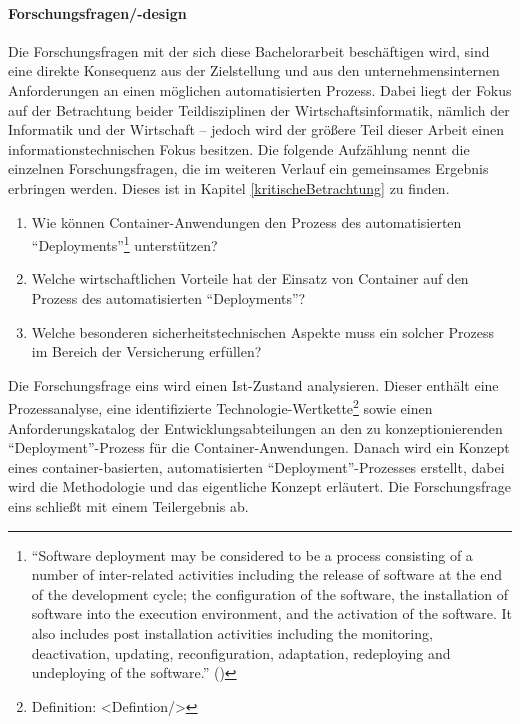 \paragraph{Forschungsfragen/-design}
Die Forschungsfragen mit der sich diese Bachelorarbeit beschäftigen wird, sind eine direkte Konsequenz aus der Zielstellung und aus den unternehmensinternen Anforderungen an einen möglichen automatisierten Prozess. Dabei liegt der Fokus auf der Betrachtung beider Teildisziplinen der Wirtschaftsinformatik, nämlich der Informatik und der Wirtschaft -- jedoch wird der größere Teil dieser Arbeit einen informationstechnischen Fokus besitzen. Die folgende Aufzählung nennt die einzelnen Forschungsfragen, die im weiteren Verlauf ein gemeinsames Ergebnis erbringen werden. Dieses ist in Kapitel \vref{kritischeBetrachtung} zu finden.
\begin{enumerate}
	\item Wie können Container-Anwendungen den Prozess des automatisierten \enquote{Deployments}\footnote{\enquote{Software deployment may be considered to be a process consisting of a number of inter-related activities including the release of software at the end of the development cycle; the configuration of the software, the installation of software into the execution environment, and the activation of the software. It also includes post installation activities including the monitoring, deactivation, updating, reconfiguration, adaptation, redeploying and undeploying of the software.} (\cite{dearle_software_2007})} unterstützen?
	\item Welche wirtschaftlichen Vorteile hat der Einsatz von Container auf den Prozess des automatisierten \enquote{Deployments}?
	\item Welche besonderen sicherheitstechnischen Aspekte muss ein solcher Prozess im Bereich der Versicherung erfüllen?
\end{enumerate}
Die Forschungsfrage eins wird einen Ist-Zustand analysieren. Dieser enthält eine Prozessanalyse, eine identifizierte Technologie-Wertkette\footnote{Definition: <Defintion/>} sowie einen Anforderungskatalog der Entwicklungsabteilungen an den zu konzeptionierenden \enquote{Deployment}-Prozess für die Container-Anwendungen. Danach wird ein Konzept eines container-basierten, automatisierten \enquote{Deployment}-Prozesses erstellt, dabei wird die Methodologie und das eigentliche Konzept erläutert. Die Forschungsfrage eins schließt mit einem Teilergebnis ab. \par

